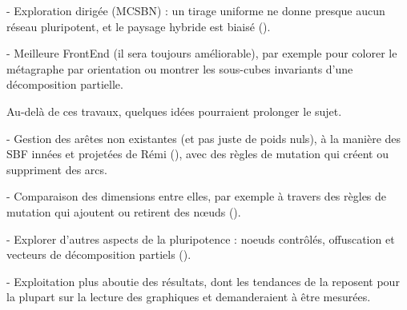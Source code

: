 \documentclass[12pt, a4paper]{article}
\begin{document}
- Exploration dirigée (MCSBN) : un tirage uniforme ne donne presque aucun réseau pluripotent, et le paysage hybride est biaisé ().

- Meilleure FrontEnd (il sera toujours améliorable), par exemple pour colorer le métagraphe par orientation ou montrer les sous-cubes invariants d'une décomposition partielle.

\vspace{5pt}
Au-delà de ces travaux, quelques idées pourraient prolonger le sujet.

- Gestion des arêtes non existantes (et pas juste de poids nuls), à la manière des SBF innées et projetées de Rémi (), avec des règles de mutation qui créent ou suppriment des arcs.

- Comparaison des dimensions entre elles, par exemple à travers des règles de mutation qui ajoutent ou retirent des nœuds ().

- Explorer d'autres aspects de la pluripotence : noeuds contrôlés, offuscation et vecteurs de décomposition partiels ().

- Exploitation plus aboutie des résultats, dont les tendances de la  reposent pour la plupart sur la lecture des graphiques et demanderaient à être mesurées.



\newpage
\printbibliography[title={Références}]

\newpage
\appendix





\end{document}

